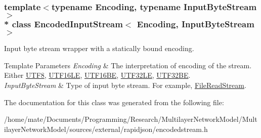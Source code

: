 \subsubsection*{template$<$typename Encoding, typename Input\+Byte\+Stream$>$\\*
class Encoded\+Input\+Stream$<$ Encoding, Input\+Byte\+Stream $>$}

Input byte stream wrapper with a statically bound encoding. 


\begin{DoxyTemplParams}{Template Parameters}
{\em Encoding} & The interpretation of encoding of the stream. Either \hyperlink{structUTF8}{U\+T\+F8}, \hyperlink{structUTF16LE}{U\+T\+F16\+LE}, \hyperlink{structUTF16BE}{U\+T\+F16\+BE}, \hyperlink{structUTF32LE}{U\+T\+F32\+LE}, \hyperlink{structUTF32BE}{U\+T\+F32\+BE}. \\
\hline
{\em Input\+Byte\+Stream} & Type of input byte stream. For example, \hyperlink{classFileReadStream}{File\+Read\+Stream}. \\
\hline
\end{DoxyTemplParams}


The documentation for this class was generated from the following file\+:\begin{DoxyCompactItemize}
\item 
/home/mate/\+Documents/\+Programming/\+Research/\+Multilayer\+Network\+Model/\+Multilayer\+Network\+Model/sources/external/rapidjson/encodedstream.\+h\end{DoxyCompactItemize}

